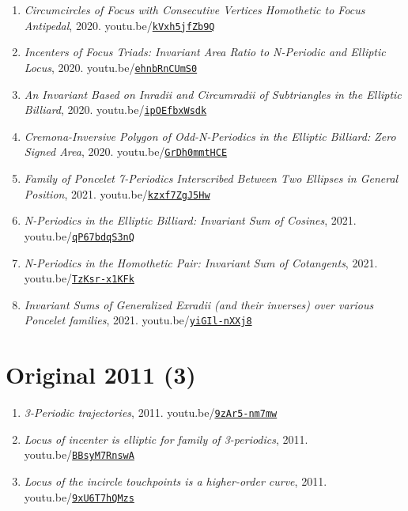 \documentclass[12pt]{article}
\begin{document}
\begin{enumerate}[resume]
\item \textit{Circumcircles of Focus with Consecutive Vertices Homothetic to Focus Antipedal}, 2020. youtu.be/\href{https://youtu.be/kVxh5jfZb9Q}{\nolinkurl{kVxh5jfZb9Q}}
\item \textit{Incenters of Focus Triads: Invariant Area Ratio to N-Periodic and Elliptic Locus}, 2020. youtu.be/\href{https://youtu.be/ehnbRnCUmS0}{\nolinkurl{ehnbRnCUmS0}}
\item \textit{An Invariant Based on Inradii and Circumradii of Subtriangles in the Elliptic Billiard}, 2020. youtu.be/\href{https://youtu.be/ipOEfbxWsdk}{\nolinkurl{ipOEfbxWsdk}}
\item \textit{Cremona-Inversive Polygon of Odd-N-Periodics in the Elliptic Billiard: Zero Signed Area}, 2020. youtu.be/\href{https://youtu.be/GrDh0mmtHCE}{\nolinkurl{GrDh0mmtHCE}}
\item \textit{Family of Poncelet 7-Periodics Interscribed Between Two Ellipses in General Position}, 2021. youtu.be/\href{https://youtu.be/kzxf7ZgJ5Hw}{\nolinkurl{kzxf7ZgJ5Hw}}
\item \textit{N-Periodics in the Elliptic Billiard: Invariant Sum of Cosines}, 2021. youtu.be/\href{https://youtu.be/qP67bdqS3nQ}{\nolinkurl{qP67bdqS3nQ}}
\item \textit{N-Periodics in the Homothetic Pair: Invariant Sum of Cotangents}, 2021. youtu.be/\href{https://youtu.be/TzKsr-x1KFk}{\nolinkurl{TzKsr-x1KFk}}
\item \textit{Invariant Sums of Generalized Exradii (and their inverses) over various Poncelet families}, 2021. youtu.be/\href{https://youtu.be/yiGIl-nXXj8}{\nolinkurl{yiGIl-nXXj8}}
\end{enumerate}

\section{Original 2011 (3)}

\begin{enumerate}[resume]
\item \textit{3-Periodic trajectories}, 2011. youtu.be/\href{https://youtu.be/9zAr5-nm7mw}{\nolinkurl{9zAr5-nm7mw}}
\item \textit{Locus of incenter is elliptic for family of 3-periodics}, 2011. youtu.be/\href{https://youtu.be/BBsyM7RnswA}{\nolinkurl{BBsyM7RnswA}}
\item \textit{Locus of the incircle touchpoints is a higher-order curve}, 2011. youtu.be/\href{https://youtu.be/9xU6T7hQMzs}{\nolinkurl{9xU6T7hQMzs}}
\end{enumerate}
\end{document}
